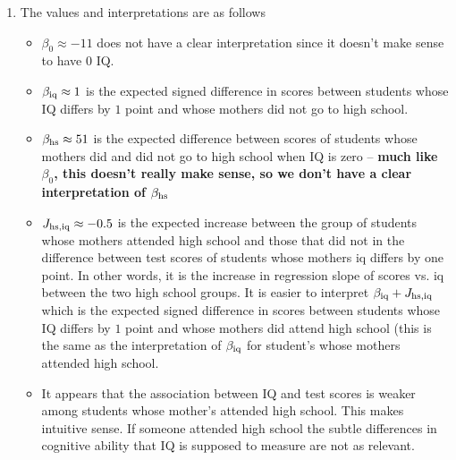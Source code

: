 \begin{example}
\begin{enumerate}[label=(\alph*)]
\item The values and interpretations are as follows
\begin{itemize}
\item $\beta_0 \approx -11$ does not have a clear interpretation since it doesn't make sense to have $0$ IQ. 
\item $\beta_{\rm iq}\approx 1$ is the expected signed difference in scores between students whose IQ differs by $1$ point and whose mothers did not go to high school. 
\item $\beta_{\rm hs} \approx 51$ is the expected difference between scores of students whose mothers did and did not go to high school when IQ is zero -- {\bf much like $\beta_0$, this doesn't really make sense, so we don't have a clear interpretation of $\beta_{\rm hs}$}
\item $J_{\rm hs,iq}\approx -0.5$ is the expected increase between the group of students whose mothers attended high school and those that did not in the difference between test scores of students whose mothers iq differs by one point. In other words, it is the increase in regression slope of scores vs. iq between the two high school groups. It is easier to interpret $\beta_{\rm iq}  + J_{\rm hs,iq}$ which is the expected signed difference in scores between students whose IQ differs by $1$ point and whose mothers did attend high school (this is the same as the interpretation of $\beta_{\rm iq}$ for student's whose mothers attended high school. 
\item It appears that the association between IQ and test scores is weaker among students whose mother's attended high school. This makes intuitive sense. If someone attended high school the subtle differences in cognitive ability that IQ is supposed to measure are not as relevant. 
\end{itemize}
\end{enumerate}



\end{example}

